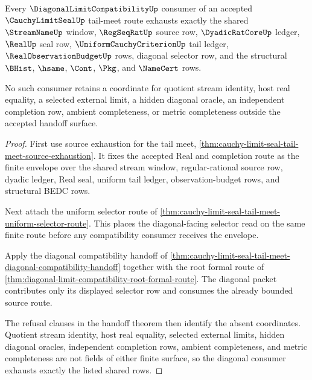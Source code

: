 \begin{theorem}
\label{thm:cauchy-limit-seal-tail-meet-diagonal-source-exhaustion}
Every $\DiagonalLimitCompatibilityUp$ consumer of an accepted $\CauchyLimitSealUp$ tail-meet route exhausts exactly the shared $\StreamNameUp$ window, $\RegSeqRatUp$ source row, $\DyadicRatCoreUp$ ledger, $\RealUp$ seal row, $\UniformCauchyCriterionUp$ tail ledger, $\RealObservationBudgetUp$ rows, diagonal selector row, and the structural $\BHist$, $\hsame$, $\Cont$, $\Pkg$, and $\NameCert$ rows.

No such consumer retains a coordinate for quotient stream identity, host real equality, a selected external limit, a hidden diagonal oracle, an independent completion row, ambient completeness, or metric completeness outside the accepted handoff surface.
\end{theorem}
\begin{proof}
First use source exhaustion for the tail meet, \autoref{thm:cauchy-limit-seal-tail-meet-source-exhaustion}. It fixes the accepted Real and completion route as the finite envelope over the shared stream window, regular-rational source row, dyadic ledger, Real seal, uniform tail ledger, observation-budget rows, and structural BEDC rows.

Next attach the uniform selector route of \autoref{thm:cauchy-limit-seal-tail-meet-uniform-selector-route}. This places the diagonal-facing selector read on the same finite route before any compatibility consumer receives the envelope.

Apply the diagonal compatibility handoff of \autoref{thm:cauchy-limit-seal-tail-meet-diagonal-compatibility-handoff} together with the root formal route of \autoref{thm:diagonal-limit-compatibility-root-formal-route}. The diagonal packet contributes only its displayed selector row and consumes the already bounded source route.

The refusal clauses in the handoff theorem then identify the absent coordinates. Quotient stream identity, host real equality, selected external limits, hidden diagonal oracles, independent completion rows, ambient completeness, and metric completeness are not fields of either finite surface, so the diagonal consumer exhausts exactly the listed shared rows.
\end{proof}

